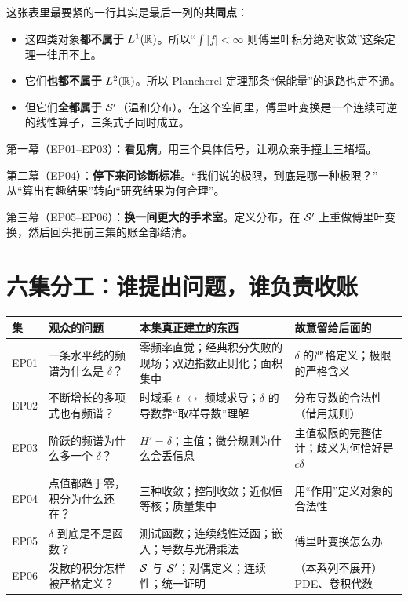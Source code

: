 这张表里最要紧的一行其实是最后一列的\textbf{共同点}：

\begin{itemize}[leftmargin=1.6em,itemsep=0.3em]
\item 这四类对象\textbf{都不属于} $L^1(\mathbb{R})$。所以“$\int|f|<\infty$ 则傅里叶积分绝对收敛”这条定理一律用不上。
\item 它们\textbf{也都不属于} $L^2(\mathbb{R})$。所以 Plancherel 定理那条“保能量”的退路也走不通。
\item 但它们\textbf{全都属于} $\mathcal{S}'$（温和分布）。在这个空间里，傅里叶变换是一个连续可逆的线性算子，三条式子同时成立。
\end{itemize}

\begin{ideabox}
第一幕（EP01--EP03）：\textbf{看见病}。用三个具体信号，让观众亲手撞上三堵墙。

第二幕（EP04）：\textbf{停下来问诊断标准}。“我们说的极限，到底是哪一种极限？”——从“算出有趣结果”转向“研究结果为何合理”。

第三幕（EP05--EP06）：\textbf{换一间更大的手术室}。定义分布，在 $\mathcal{S}'$ 上重做傅里叶变换，然后回头把前三集的账全部结清。
\end{ideabox}

\section{六集分工：谁提出问题，谁负责收账}

\begin{center}
\small
\renewcommand{\arraystretch}{1.45}
\begin{tabularx}{\textwidth}{@{}L{1.0cm}L{4.2cm}L{4.4cm}L{4.9cm}@{}}
\toprule
集 & 观众的问题 & 本集真正建立的东西 & 故意留给后面的 \\
\midrule
EP01 & 一条水平线的频谱为什么是 $\delta$？ & 零频率直觉；经典积分失败的现场；双边指数正则化；面积集中 & $\delta$ 的严格定义；极限的严格含义 \\
EP02 & 不断增长的多项式也有频谱？ & 时域乘 $t$ $\leftrightarrow$ 频域求导；$\delta$ 的导数靠“取样导数”理解 & 分布导数的合法性（借用规则） \\
EP03 & 阶跃的频谱为什么多一个 $\delta$？ & $H'=\delta$；主值；微分规则为什么会丢信息 & 主值极限的完整估计；歧义为何恰好是 $c\delta$ \\
EP04 & 点值都趋于零，积分为什么还在？ & 三种收敛；控制收敛；近似恒等核；质量集中 & 用“作用”定义对象的合法性 \\
EP05 & $\delta$ 到底是不是函数？ & 测试函数；连续线性泛函；嵌入；导数与光滑乘法 & 傅里叶变换怎么办 \\
EP06 & 发散的积分怎样被严格定义？ & $\mathcal{S}$ 与 $\mathcal{S}'$；对偶定义；连续性；统一证明 & （本系列不展开）PDE、卷积代数 \\
\bottomrule
\end{tabularx}
\end{center}


